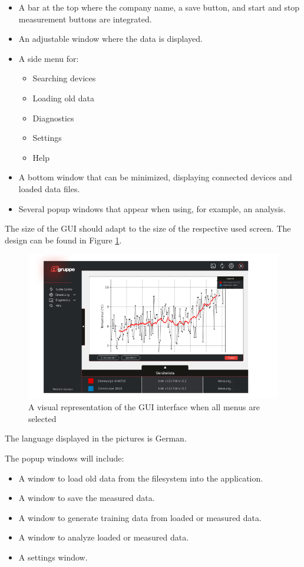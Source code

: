 \documentclass[]{scrreprt}
\begin{document}
\begin{itemize}
    \item A bar at the top where the company name, a save button, and start and stop measurement buttons are integrated.
    \item An adjustable window where the data is displayed.
    \item A side menu for:
    \begin{itemize}
        \item Searching devices
        \item Loading old data
        \item Diagnostics
        \item Settings
        \item Help
    \end{itemize}
    \item A bottom window that can be minimized, displaying connected devices and loaded data files.
    \item Several popup windows that appear when using, for example, an analysis.
\end{itemize}

The size of the GUI should adapt to the size of the respective used screen. The design can be found in Figure \ref{fig:GUI}.

\begin{figure}[!h]
    \includegraphics[width=.9\textwidth]{./assets/pictures/DatawindowVersion1.0.png}
    \caption[]{A visual representation of the GUI interface when all menus are selected}
    \label{fig:GUI}
\end{figure}

The language displayed in the pictures is German.

The popup windows will include:

\begin{itemize}
    \item A window to load old data from the filesystem into the application.
    \item A window to save the measured data.
    \item A window to generate training data from loaded or measured data.
    \item A window to analyze loaded or measured data.
    \item A settings window.
\end{itemize}
\end{document}
